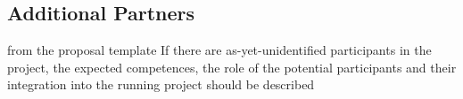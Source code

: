 \subsection{Additional Partners}\label{sec:assoc-partner}
\begin{todo}{from the proposal template}
  If there are as-yet-unidentified participants in the project, the expected competences,
  the role of the potential participants and their integration into the running project
  should be described
\end{todo}

